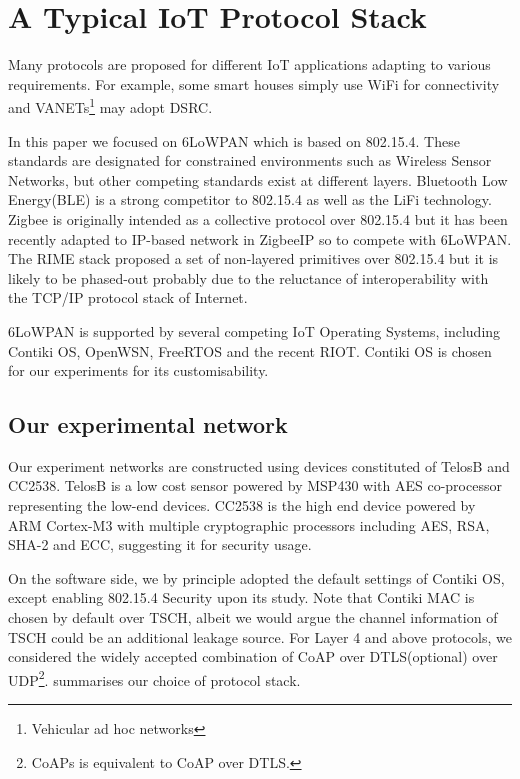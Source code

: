 \section{A Typical IoT Protocol Stack\label{sec: IotProtocols}} 
Many protocols are proposed for different IoT applications adapting to various requirements. For example, some smart houses simply use WiFi for connectivity and VANETs\footnote{Vehicular ad hoc networks} may adopt DSRC\cite{DSRC}. 

In this paper we focused on 6LoWPAN\cite{rfc4944} which is based on 802.15.4\cite{802154}. These standards are designated for constrained environments such as Wireless Sensor Networks,  but other competing standards exist at different layers. Bluetooth Low Energy(BLE)\cite{BLE} is a strong competitor to 802.15.4 as well as the LiFi\cite{LiFi} technology. Zigbee\cite{Zigbee} is originally intended as a collective protocol over 802.15.4 but it has been recently adapted to IP-based network in ZigbeeIP\cite{ZigbeeIp} so to compete with 6LoWPAN. The RIME stack\cite{RIME} proposed a set of non-layered primitives over 802.15.4 but it is likely to be phased-out probably due to the reluctance of interoperability with the TCP/IP protocol stack of Internet. 

6LoWPAN is supported by several competing IoT Operating Systems, including Contiki OS\cite{Contiki}, OpenWSN\cite{OpenWSN}, FreeRTOS\cite{FreeRTOS} and the recent RIOT\cite{RIOT}. Contiki OS is chosen for our experiments for its customisability.

\subsection{Our experimental network}
Our experiment networks are constructed using devices constituted of TelosB\cite{TelosB} and CC2538\cite{CC2538}. TelosB is a low cost sensor powered by MSP430 with AES co-processor representing the low-end devices. CC2538 is the high end device powered by ARM Cortex-M3 with multiple cryptographic processors including AES, RSA, SHA-2 and ECC, suggesting it for security usage.

On the software side, we by principle adopted the default settings of Contiki OS, except enabling 802.15.4 Security\cite{802154} upon its study. Note that Contiki MAC\cite{ContikiMAC} is chosen by default over TSCH\cite{TSCH}, albeit we would argue the channel information of TSCH could be an additional leakage source. For Layer 4\cite{OSI} and above protocols, we considered the widely accepted combination of CoAP\cite{rfc7252} over DTLS\cite{rfc6347}(optional) over UDP\cite{rfc768}\footnote{CoAPs is equivalent to CoAP over DTLS.}.  summarises our choice of protocol stack.


